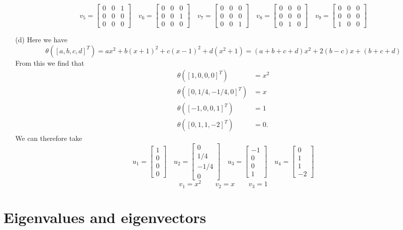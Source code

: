 \documentclass{amsart}
\newcommand{\bsm}       {\left[\begin{smallmatrix}}
\newcommand{\esm}       {\end{smallmatrix}\right]}
\newcommand{\tht}       {\theta}
\renewcommand{\:}       {\colon}
\theoremstyle{definition}
\renewenvironment{solution}{\SolutionAtEnd}{\endSolutionAtEnd}
\begin{document}
\begin{solution}
\begin{itemize}
   {\tiny \[
    v_5 = \bsm 0&0&1\\0&0&0\\0&0&0\esm\hspace{1em}
    v_6 = \bsm 0&0&0\\0&0&1\\0&0&0\esm\hspace{1em}
    v_7 = \bsm 0&0&0\\0&0&0\\0&0&1\esm\hspace{1em}
    v_8 = \bsm 0&0&0\\0&0&0\\0&1&0\esm\hspace{1em}
    v_9 = \bsm 0&0&0\\0&0&0\\1&0&0\esm
   \]}
  \item[(d)] Here we have
   \[ \tht([a,b,c,d]^T) = ax^2+b(x+1)^2+c(x-1)^2+d(x^2+1)
       = (a+b+c+d)x^2+2(b-c)x+(b+c+d)
   \]
   From this we find that
   \begin{align*}
    \tht([1,0,0,0]^T) &= x^2 \\
    \tht([0,1/4,-1/4,0]^T) &= x \\
    \tht([-1,0,0,1]^T) &= 1 \\
    \tht([0,1,1,-2]^T) &= 0.
   \end{align*}
   We can therefore take
   \[ u_1 = \bsm 1\\0\\0\\0 \esm \hspace{1em}
      u_2 = \bsm 0\\ 1/4 \\ -1/4 \\ 0 \esm \hspace{1em} 
      u_3 = \bsm -1\\ 0 \\ 0 \\ 1 \esm \hspace{1em} 
      u_4 = \bsm 0\\ 1\\ 1\\ -2 \esm
   \]
   \[ v_1 = x^2 \hspace{2em} v_2 = x \hspace{2em} v_3 = 1 \]
 \end{itemize}
\end{solution}

\section{Eigenvalues and eigenvectors}
\label{sec-eigen}
\end{document}
